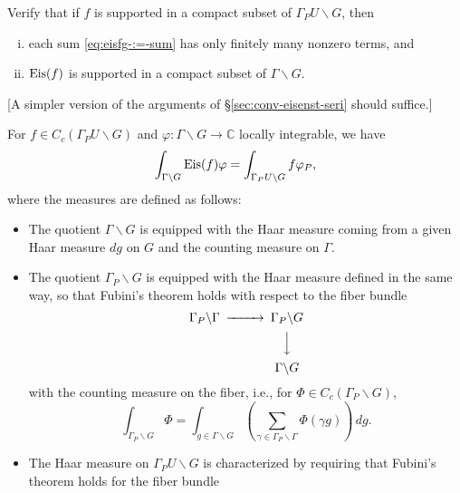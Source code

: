 \documentclass[reqno]{amsart} 
\begin{document}
\begin{example}
  Verify that if $f$ is supported in a compact subset of $\Gamma_P U \backslash G$, then
  \begin{enumerate}
    [(i)]
  \item each sum \eqref{eq:eisfg-:=-sum} has only finitely many nonzero terms, and
  \item $\operatorname{Eis}(f)$ is supported in a compact subset of $\Gamma \backslash G$.
  \end{enumerate}
  [A simpler version of the arguments of \S\ref{sec:conv-eisenst-seri} should suffice.]
\end{example}

\begin{lemma}\label{lem:stoes2021:f-in-c_cgamma_p-1}
  For $f \in C_c(\Gamma_P U \backslash G)$ and $\varphi : \Gamma \backslash G \rightarrow \mathbb{C}$ locally integrable, we have
  \begin{equation}\label{eq:int-_gamma-backslash}
    \int _{\Gamma \backslash G} \operatorname{Eis}(f) \varphi = \int _{\Gamma_P U \backslash G} f \varphi_P,
  \end{equation}
  where the measures are defined as follows:
  \begin{itemize}
  \item The quotient $\Gamma \backslash G$ is equipped with the Haar measure coming from a given Haar measure $d g$ on $G$ and the counting measure on $\Gamma$.
  \item The quotient $\Gamma_P \backslash G$ is equipped with the Haar measure defined in the same way, so that Fubini's theorem holds with respect to the fiber bundle
    \begin{equation}\label{eq:begincd-gamm-backsl}
      \begin{CD}         
        \Gamma_P \backslash \Gamma  @>>>  \Gamma_P \backslash G \\
        @.  @VVV \\
        @. \Gamma \backslash G \\
      \end{CD}
    \end{equation}
    with the counting measure on the fiber, i.e., for $\Phi \in C_c(\Gamma_P \backslash G)$,
    \begin{equation*}
      \int _{\Gamma_P \backslash G} \Phi
      =
      \int _{g \in \Gamma \backslash G} (\sum _{\gamma \in \Gamma_P \backslash \Gamma } \Phi(\gamma g)) \, d g.
    \end{equation*}
  \item The Haar measure on $\Gamma_P U \backslash G$ is characterized by requiring that Fubini's theorem holds for the fiber bundle

\end{itemize}
\end{lemma}
\end{document}
